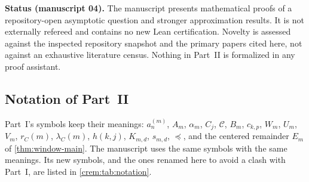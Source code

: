 \documentclass[11pt,a4paper]{article}
\theoremstyle{definition}\newaliascnt{definition}{theorem}
\theoremstyle{remark}\newaliascnt{remark}{theorem}
\newcommand{\Cat}{\mathcal C}
\newcommand{\preceqc}{\preceq}
\begin{document}
\begin{resultbox}
\textbf{Status (manuscript 04).} The manuscript presents mathematical proofs
of a repository-open asymptotic question and stronger approximation results.
It is not externally refereed and contains no new Lean certification. Novelty
is assessed against the inspected repository snapshot and the primary papers
cited here, not against an exhaustive literature census. Nothing in Part~II
is formalized in any proof assistant.
\end{resultbox}

\subsection{Notation of Part~II}
\label{crem:sec:notation}
Part~I's symbols keep their meanings: $a_n^{(m)}$, $A_m$, $\alpha_m$,
$C_j$, $\Cat$, $B_m$, $c_{k,p}$, $W_m$, $U_m$, $V_m$, $r_C(m)$,
$\lambda_C(m)$, $h(k,j)$, $K_{m,d}$, $s_{m,d}$, $\preceqc$, and the centered
remainder $E_m$ of \cref{thm:window-main}. The manuscript uses the same
symbols with the same meanings. Its new symbols, and the ones renamed here to
avoid a clash with Part~I, are listed in \cref{crem:tab:notation}.
\end{document}
